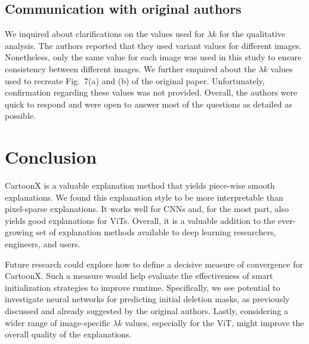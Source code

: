 \subsection{Communication with original authors}

We inquired about clarifications on the values used for $\lambda k$ for the qualitative analysis.
The authors reported that they used variant values for different images.
Nonetheless, only the same value for each image was used in this study to ensure consistency between different images.
We further enquired about the $\lambda k$ values used to recreate Fig.~7(a) and (b) of the original paper.
Unfortunately, confirmation regarding these values was not provided.
Overall, the authors were quick to respond and were open to answer most of the questions as detailed as possible.


\section{Conclusion}\label{sec:conclusion}

CartoonX is a valuable explanation method that yields piece-wise smooth explanations.
We found this explanation style to be more interpretable than pixel-sparse explanations.
It works well for CNNs and, for the most part, also yields good explanations for ViTs.
Overall, it is a valuable addition to the ever-growing set of explanation methods available to deep learning researchers, engineers, and users.

Future research could explore how to define a decisive measure of convergence for CartoonX.
Such a measure would help evaluate the effectiveness of smart initialization strategies to improve runtime. 
Specifically, we see potential to investigate neural networks for predicting initial deletion masks, as previously discussed and already suggested by the original authors.
Lastly, considering a wider range of image-specific $\lambda k$ values, especially for the ViT, might improve the overall quality of the explanations.
